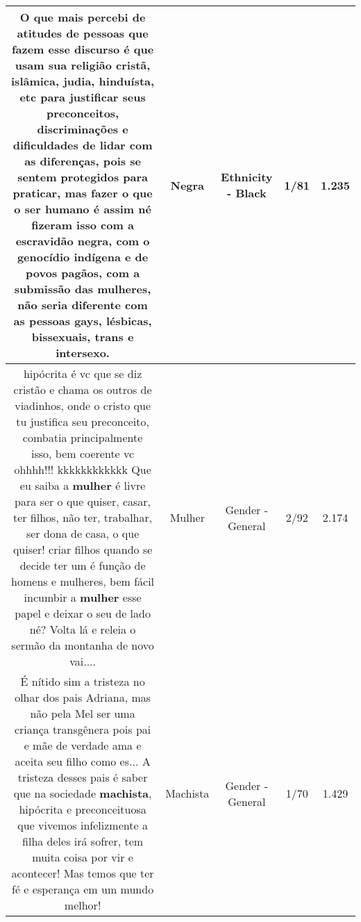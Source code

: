 \documentclass[11pt]{article}
\newlength\mylength
\begin{document}
\begin{center}
\begin{longtable}{|C{.65\mylength}|C{.30\mylength}|C{.12\mylength}|C{.12\mylength}|C{.12\mylength}|}
  \small O que mais percebi de atitudes de pessoas que fazem esse discurso é que usam sua religião cristã, islâmica, judia, hinduísta, etc para justificar seus preconceitos, discriminações e dificuldades de lidar com as diferenças, pois se sentem protegidos para praticar, mas fazer o que o ser humano é assim né fizeram isso com a escravidão \textbf{negra}, com o genocídio indígena e de povos pagãos, com a submissão das mulheres, não seria diferente com as pessoas gays, lésbicas, bissexuais, trans e intersexo.\normalsize   & Negra & Ethnicity - Black & 1/81 & 1.235 \\  \hline
  \small hipócrita é vc que se diz cristão e chama os outros de viadinhos, onde o cristo que tu justifica seu preconceito, combatia principalmente isso, bem coerente vc ohhhh!!! kkkkkkkkkkkk Que eu saiba a \textbf{mulher} é livre para ser o que quiser, casar, ter filhos, não ter, trabalhar, ser dona de casa, o que quiser!  criar filhos quando se decide ter um é função de homens e mulheres, bem fácil incumbir a \textbf{mulher} esse papel e deixar o seu de lado né? Volta lá e releia o sermão da montanha de novo vai....\normalsize   & Mulher & Gender - General & 2/92 & 2.174 \\  \hline
  \small É nítido sim a tristeza no olhar dos pais Adriana,  mas não pela Mel ser uma criança transgênera pois pai e mãe de verdade ama e aceita seu filho como es... A tristeza desses pais é saber que na sociedade \textbf{machista}, hipócrita e preconceituosa que vivemos infelizmente a filha deles irá sofrer,  tem muita coisa por vir e acontecer! Mas temos que ter fé e esperança em um mundo melhor!\normalsize   & Machista & Gender - General & 1/70 & 1.429 \\  \hline

\end{longtable}
\end{center}
\end{document}
